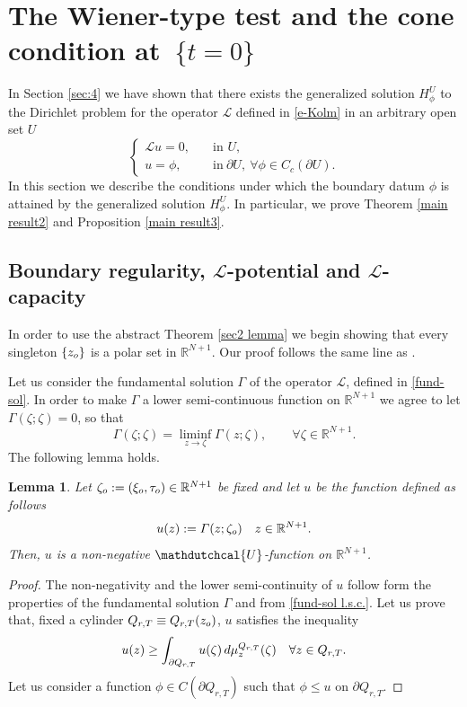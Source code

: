 \documentclass{amsart}
\newtheorem{lemma}[thm]{Lemma}
\numberwithin{equation}{section}
\def \p{{\phi}}
\def \Lc{{\mathcal{L}}}
\def \r{{\mathbb{R}}}
\def \Ud{{\mathdutchcal{U}}}
\renewcommand{\Gamma}{\varGamma}
\begin{document}
{\section{The Wiener-type test and the cone condition at~$\{t=0\}$}\label{sec:5}
In Section \ref{sec:4} we have shown that there exists the generalized solution $H^U_\p$ to the Dirichlet problem for the operator $\Lc$ defined in \eqref{e-Kolm} in an arbitrary open set $U$
$$
\begin{cases}
\Lc u = 0, & \quad \mbox{in } U,\\
u=\p, & \quad \text{in}\  \partial U, \ \forall \p \in {C}_c(\partial U).
\end{cases}
$$
In this {section} we describe the conditions under which the boundary datum $\p$ is attained by the generalized solution $H^U_\p$. In particular, we prove Theorem \ref{main result2} and  Proposition \ref{main result3}. 

\subsection{Boundary regularity, $\Lc$-potential and $\Lc$-capacity}
In order to use the abstract Theorem \ref{sec2 lemma} we begin showing that every singleton $\{z_{\rm o}\}$ is a polar set in $\r^{N+1}$. Our proof follows the same line as \cite[Lemma 4.5]{LU10}.

Let us consider the fundamental solution $\Gamma$ of the operator $\Lc$, defined in \eqref{fund-sol}. In order to make $\Gamma$ a lower semi-continuous function on $\r^{N+1}$ we agree to let $\Gamma(\zeta;\zeta)=0$, so that
\begin{equation}\label{fund-sol l.s.c.}
\Gamma(\zeta;\zeta) = \liminf_{z \rightarrow \zeta} \Gamma (z;\zeta), \qquad
 \forall \zeta \in \r^{N+1}.
\end{equation}
The following lemma holds.
\begin{lemma}\label{s5 polar lem1}
Let $\zeta_{\rm o} := (\xi_{\rm o},\tau_{\rm o}) \in \r^{N+1}$ be fixed and let $u$ be the function defined as follows
\begin{equation}\label{s5 polar lem2}
u(z):= \Gamma(z;\zeta_{\rm o}) \quad z \in \r^{N+1}.
\end{equation}
Then, $u$ is a non-negative $\Ud$-function on $\r^{N+1}$.
\end{lemma}
\begin{proof}
The non-negativity  and the lower semi-continuity of $u$ follow form  the properties of the fundamental solution $\Gamma$ and from \eqref{fund-sol l.s.c.}. Let us prove that, fixed a cylinder ${Q}_{r,T} \equiv {Q}_{r,T}(z_{\rm o})$, $u$ satisfies the inequality
\begin{equation*}%
u(z)  \geq \int_{\partial{Q}_{r,T}} u(\zeta) \, {\rm d}\mu^{{Q}_{r,T}}_z(\zeta) \quad \forall z \in {Q}_{r,T}.
\end{equation*}
Let us consider a function $\p \in {C}(\partial {Q}_{r,T})$ such that $\p \leq u$ on {$\partial {Q}_{r,T}$}.


\end{proof}}
\end{document}
